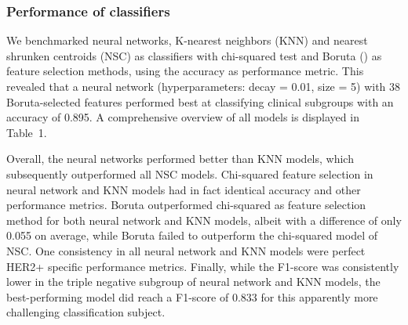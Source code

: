    \subsubsection{Performance of classifiers}
        We benchmarked neural networks, K-nearest neighbors (KNN) and nearest shrunken centroids (NSC) as classifiers with chi-squared test and Boruta (\citealp{Kursa2010}) as feature selection methods, using the accuracy as performance metric. This revealed that a neural network (hyperparameters: decay = 0.01, size = 5) with 38 Boruta-selected features performed best at classifying clinical subgroups with an accuracy of 0.895. A comprehensive overview of all models is displayed in Table~1\vphantom{\ref{Tab:01}}.
        
        Overall, the neural networks performed better than KNN models, which subsequently outperformed all NSC models. Chi-squared feature selection in neural network and KNN models had in fact identical accuracy and other performance metrics. Boruta outperformed chi-squared as feature selection method for both neural network and KNN models, albeit with a difference of only 0.055 on average, while Boruta failed to outperform the chi-squared model of NSC. One consistency in all neural network and KNN models were perfect HER2+ specific performance metrics. Finally, while the F1-score was consistently lower in the triple negative subgroup of neural network and KNN models, the best-performing model did reach a F1-score of 0.833 for this apparently more challenging classification subject.
    
